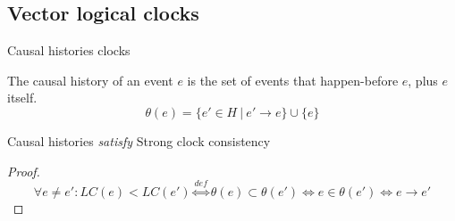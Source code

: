 % 
% 
% 
% 
% 

\subsection{Vector logical clocks}

\begin{frame}{Causal histories clocks}

\begin{definition}
The \alert{causal history} of an event $e$ is the set of events that happen-before
$e$, plus $e$ itself.
\[
\theta(e) = \{ e' \in H ~|~ e' \rightarrow e \} \cup \{ e \}
\]
\end{definition}

\begin{theorem}
Causal histories \emph{satisfy} Strong clock consistency
\end{theorem}

\pause
\begin{proof}
\[
   \forall e \neq e': LC(e) < LC(e') \stackrel{def}{\Leftrightarrow} \theta(e) \subset \theta(e') \Leftrightarrow e \in \theta(e') \Leftrightarrow e \rightarrow e'
\]
\end{proof}

\end{frame}

% 
% 
% 
% 
% 


